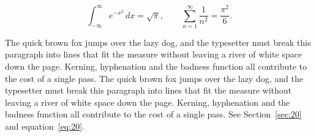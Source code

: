 \documentclass{article}
\begin{document}
\begin{equation}\label{eq:20}
\int_{-\infty}^{\infty} e^{-x^{2}}\,dx = \sqrt{\pi}, \qquad
\sum_{n=1}^{\infty} \frac{1}{n^{2}} = \frac{\pi^{2}}{6}.
\end{equation}

The quick brown fox jumps over the lazy dog, and the typesetter must break this paragraph into lines that fit the measure without leaving a river of white space down the page. Kerning, hyphenation and the badness function all contribute to the cost of a single pass. The quick brown fox jumps over the lazy dog, and the typesetter must break this paragraph into lines that fit the measure without leaving a river of white space down the page. Kerning, hyphenation and the badness function all contribute to the cost of a single pass. 
See Section~\ref{sec:20} and equation~\eqref{eq:20}.
\end{document}
